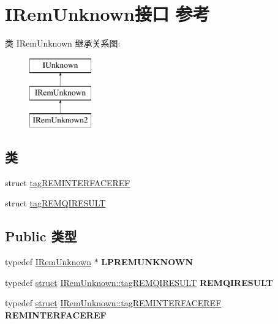 \hypertarget{interface_i_rem_unknown}{}\section{I\+Rem\+Unknown接口 参考}
\label{interface_i_rem_unknown}
类 I\+Rem\+Unknown 继承关系图\+:\begin{figure}[H]
\begin{center}
\leavevmode
\includegraphics[height=3.000000cm]{interface_i_rem_unknown}
\end{center}
\end{figure}
\subsection*{类}
\begin{DoxyCompactItemize}
\item 
struct \hyperlink{struct_i_rem_unknown_1_1tag_r_e_m_i_n_t_e_r_f_a_c_e_r_e_f}{tag\+R\+E\+M\+I\+N\+T\+E\+R\+F\+A\+C\+E\+R\+EF}
\item 
struct \hyperlink{struct_i_rem_unknown_1_1tag_r_e_m_q_i_r_e_s_u_l_t}{tag\+R\+E\+M\+Q\+I\+R\+E\+S\+U\+LT}
\end{DoxyCompactItemize}
\subsection*{Public 类型}
\begin{DoxyCompactItemize}
\item 
\mbox{\label{interface_i_rem_unknown_a1622b4d074bdf80fdd960eeab63271ca}} 
typedef \hyperlink{interface_i_rem_unknown}{I\+Rem\+Unknown} $\ast$ {\bfseries L\+P\+R\+E\+M\+U\+N\+K\+N\+O\+WN}
\item 
\mbox{\label{interface_i_rem_unknown_a6bb840b3c15b445c1cb21d132eeca7ef}} 
typedef \hyperlink{interfacestruct}{struct} \hyperlink{struct_i_rem_unknown_1_1tag_r_e_m_q_i_r_e_s_u_l_t}{I\+Rem\+Unknown\+::tag\+R\+E\+M\+Q\+I\+R\+E\+S\+U\+LT} {\bfseries R\+E\+M\+Q\+I\+R\+E\+S\+U\+LT}
\item 
\mbox{\label{interface_i_rem_unknown_a9d981c00d30e822feb9d3f55ba955088}} 
typedef \hyperlink{interfacestruct}{struct} \hyperlink{struct_i_rem_unknown_1_1tag_r_e_m_i_n_t_e_r_f_a_c_e_r_e_f}{I\+Rem\+Unknown\+::tag\+R\+E\+M\+I\+N\+T\+E\+R\+F\+A\+C\+E\+R\+EF} {\bfseries R\+E\+M\+I\+N\+T\+E\+R\+F\+A\+C\+E\+R\+EF}
\end{DoxyCompactItemize}
